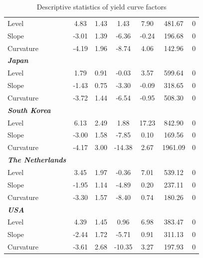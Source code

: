 \documentclass[12pt,bibliography=totoc]{article}
\begin{document}
\begin{table}[H]
\begin{tabular}{l c c c c c c}
Level	&	4.83	&	1.43	&	1.43	&	7.90	&	481.67	&	0	\\
Slope	&	-3.01	&	1.39	&	-6.36	&	-0.24	&	196.68	&	0	\\
Curvature	&	-4.19	&	1.96	&	-8.74	&	4.06	&	142.96	&	0	\\
\textit{\textbf{Japan}}	&		&		&		&		&		&		\\
Level	&	1.79	&	0.91	&	-0.03	&	3.57	&	599.64	&	0	\\
Slope	&	-1.43	&	0.75	&	-3.30	&	-0.09	&	318.65	&	0	\\
Curvature	&	-3.72	&	1.44	&	-6.54	&	-0.95	&	508.30	&	0	\\
\textit{\textbf{South Korea}}	&		&		&		&		&		&		\\
Level	&	6.13	&	2.49	&	1.88	&	17.23	&	842.90	&	0	\\
Slope	&	-3.00	&	1.58	&	-7.85	&	0.10	&	169.56	&	0	\\
Curvature	&	-4.17	&	3.00	&	-14.38	&	2.67	&	1961.09	&	0	\\
\textit{\textbf{The Netherlands}}	&		&		&		&		&		&		\\
Level	&	3.45	&	1.97	&	-0.36	&	7.01	&	539.12	&	0	\\
Slope	&	-1.95	&	1.14	&	-4.89	&	0.20	&	237.11	&	0	\\
Curvature	&	-3.30	&	1.57	&	-8.40	&	0.74	&	180.26	&	0	\\
\textit{\textbf{USA}}	&		&		&		&		&		&		\\
Level	&	4.39	&	1.45	&	0.96	&	6.98	&	383.47	&	0	\\
Slope	&	-2.44	&	1.72	&	-5.71	&	0.91	&	311.13	&	0	\\
Curvature	&	-3.61	&	2.68	&	-10.35	&	3.27	&	197.93	&	0	\\



\hline%
\end{tabular}
\caption{Descriptive statistics of yield curve factors}%
\label{tab:descriptiveStatistics}%
\end{table}


\bigskip
\end{document}
